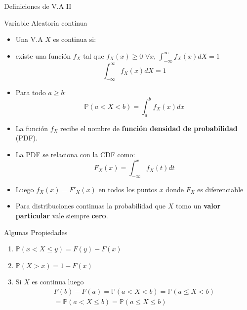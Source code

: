 \documentclass[handout]{beamer}
\begin{document}
\begin{frame}{Definiciones de V.A II}
\scriptsize{
\begin{block}{Variable Aleatoria continua}
\begin{itemize}
 \item Una V.A $X$ es continua si:
 \item existe una función $f_{X}$ tal que $f_{X}(x) \geq 0$ $\forall x$,  $\int_{-\infty}^{\infty}f_{X}(x)dX=1$
 \begin{displaymath}
      \int_{-\infty}^{\infty}f_{X}(x)dX=1
       \end{displaymath}
\item Para todo $a \geq b$:
\begin{displaymath}
 \mathbb{P}(a < X < b) = \int_{a}^{b} f_{X}(x)dx
\end{displaymath}
\end{itemize}

\end{block}

\begin{itemize}
 \item La función $f_{X}$ recibe el nombre de \textbf{función densidad de probabilidad} (PDF). 
 \item La PDF se relaciona con la CDF como:
 \begin{displaymath}
 F_{X}(x)=\int_{-\infty}^{x}f_{X}(t)dt 
 \end{displaymath}
\item Luego $f_{X}(x) = F'_X(x)$ en todos los puntos $x$ donde $F_{X}$ es diferenciable
\item Para distribuciones continuas la probabilidad que $X$ tomo un \textbf{valor particular} vale siempre \textbf{cero}.

\end{itemize}




}
\end{frame}

\begin{frame}{Algunas Propiedades}

\begin{enumerate}
 \item $ \mathbb{P}( x < X \leq y) = F(y) - F(x)$
       

\item $ \mathbb{P}(X > x) = 1 - F(x)$ 

\item Si $X$ es continua luego 
\begin{eqnarray*}
 F(b) - F(a) = \mathbb{P}(a < X < b) = \mathbb{P} ( a \leq X < b)  \\
   = \mathbb{P} ( a < X \leq b) = \mathbb{P} ( a \leq X \leq b) 
\end{eqnarray*}

\end{enumerate}



 
\end{frame}
\end{document}

